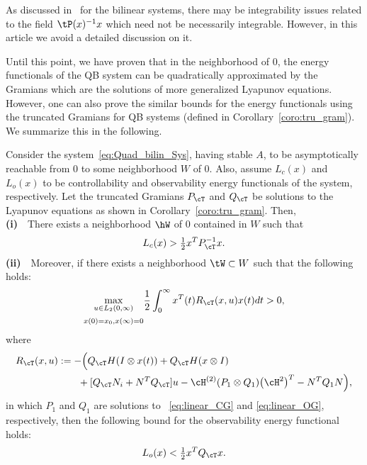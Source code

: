 \begin{remark}
As discussed in~\cite{morBenB11,verriest2008time} for the bilinear systems, there may be integrability issues related to the field $\tP(x)^{-1}x$ which need not be necessarily integrable. However, in this article we avoid a detailed discussion on it.
\end{remark}


Until this point, we have proven that in the neighborhood of $0$, the energy functionals of the QB system can be quadratically approximated by the Gramians which are the solutions of more generalized Lyapunov equations. However, one can also prove the similar bounds for the energy functionals using the truncated Gramians for QB systems (defined in Corollary~\ref{coro:tru_gram}). We summarize this in the following.
\begin{corollary}\label{coro:tru_energy}
Consider the system~\eqref{eq:Quad_bilin_Sys}, having  stable $A$, to be asymptotically reachable from $0$ to some neighborhood $W$ of $0$. Also, assume $L_c(x)$ and $L_o(x)$ to be controllability and observability energy functionals of the system, respectively. Let the truncated Gramians $P_\cT$ and $Q_\cT $ be solutions to the Lyapunov equations as shown in  Corollary~\ref{coro:tru_gram}. Then, \\
 {\bfseries (i)}~~There exists a neighborhood $\hW$ of $0$ contained in $W$ such that
 \begin{equation*}
     L_c(x) >\tfrac{1}{2}x^T P_\cT^{-1}x.
 \end{equation*}
 {\bfseries (ii)}~~Moreover, if there exists a neighborhood $\tW \subset W$ such that the following holds:
 \begin{align*}
 \underset{\begin{subarray}{c}
  u\in L_2(0,\infty) \\[5pt]
  x(0)=x_0,x(\infty) = 0
   \end{subarray}}{\text{max}} \dfrac{1}{2}\int_0^\infty x^T(t)R_\cT (x,u) x(t)dt >0,
 \end{align*}
 where
\begin{align*}
R_\cT (x,u) &:= -\Big( Q_\cT H (I\otimes x(t)) + Q_\cT H (x\otimes I) \\
& \qquad + [Q_\cT N_i + N^T Q_\cT ]u-\cH^{(2)} (P_1\otimes Q_1)  \big(\cH^{2}\big)^T- N^TQ_1N \Big),
\end{align*}
in which $P_1$ and $Q_1$ are solutions to ~\eqref{eq:linear_CG} and \eqref{eq:linear_OG}, respectively, then the following bound for the observability energy functional holds:
 \begin{equation*}
     L_o(x) <\tfrac{1}{2}x^T Q_\cT x.
 \end{equation*}
  \end{corollary}
